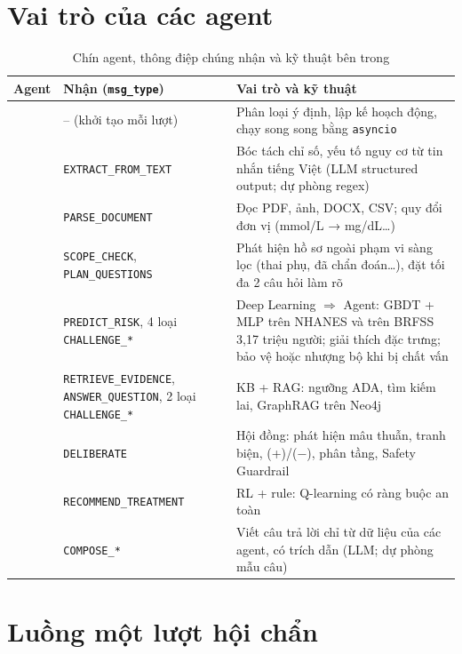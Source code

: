 \section{Vai trò của các agent}

\begin{table}[H]
\centering
\caption{Chín agent, thông điệp chúng nhận và kỹ thuật bên trong}
\label{tab:agents}
\small
\begin{tabularx}{\linewidth}{@{}L{3.3cm}L{4.3cm}Y@{}}
\toprule
\textbf{Agent} & \textbf{Nhận (\texttt{msg\_type})} & \textbf{Vai trò và kỹ thuật} \\
\midrule
{} & -- (khởi tạo mỗi lượt) & Phân loại ý định, lập kế hoạch động, chạy song song bằng \texttt{asyncio} \\
 & \texttt{EXTRACT\_FROM\_TEXT} & Bóc tách chỉ số, yếu tố nguy cơ từ tin nhắn tiếng Việt (LLM structured output; dự phòng regex) \\
 & \texttt{PARSE\_DOCUMENT} & Đọc PDF, ảnh, DOCX, CSV; quy đổi đơn vị (mmol/L → mg/dL\ldots) \\
 & \texttt{SCOPE\_CHECK}, \texttt{PLAN\_QUESTIONS} & Phát hiện hồ sơ ngoài phạm vi sàng lọc (thai phụ, đã chẩn đoán\ldots), đặt tối đa 2 câu hỏi làm rõ \\
 & \texttt{PREDICT\_RISK}, 4 loại \texttt{CHALLENGE\_*} & Deep Learning $\Rightarrow$ Agent: GBDT + MLP trên NHANES và trên BRFSS 3,17 triệu người; giải thích đặc trưng; bảo vệ hoặc nhượng bộ khi bị chất vấn \\
 & \texttt{RETRIEVE\_EVIDENCE}, \texttt{ANSWER\_QUESTION}, 2 loại \texttt{CHALLENGE\_*} & KB + RAG: ngưỡng ADA, tìm kiếm lai, GraphRAG trên Neo4j \\
 & \texttt{DELIBERATE} & Hội đồng: phát hiện mâu thuẫn, tranh biện, (+)/(−), phân tầng, Safety Guardrail \\
 & \texttt{RECOMMEND\_TREATMENT} & RL + rule: Q-learning có ràng buộc an toàn \\
 & \texttt{COMPOSE\_*} & Viết câu trả lời chỉ từ dữ liệu của các agent, có trích dẫn (LLM; dự phòng mẫu câu) \\
\bottomrule
\end{tabularx}
\end{table}

\section{Luồng một lượt hội chẩn}

